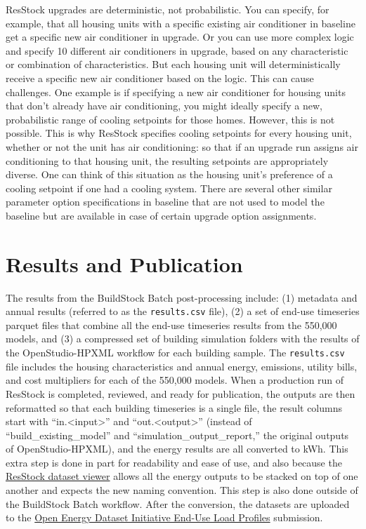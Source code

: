 ResStock upgrades are deterministic, not probabilistic. You can specify, for example, that all housing units with a specific existing air conditioner in baseline get a specific new air conditioner in upgrade. Or you can use more complex logic and specify 10 different air conditioners in upgrade, based on any characteristic or combination of characteristics. But each housing unit will deterministically receive a specific new air conditioner based on the logic. This can cause challenges. One example is if specifying a new air conditioner for housing units that don't already have air conditioning, you might ideally specify a new, probabilistic range of cooling setpoints for those homes. However, this is not possible. This is why ResStock specifies cooling setpoints for every housing unit, whether or not the unit has air conditioning: so that if an upgrade run assigns air conditioning to that housing unit, the resulting setpoints are appropriately diverse. One can think of this situation as the housing unit's preference of a cooling setpoint if one had a cooling system. There are several other similar parameter option specifications in baseline that are not used to model the baseline but are available in case of certain upgrade option assignments.



\section{Results and Publication}
The results from the BuildStock Batch post-processing include: (1) metadata and annual results (referred to as the \texttt{results.csv} file), (2) a set of end-use timeseries parquet files that combine all the end-use timeseries results from the 550,000 models, and (3) a compressed set of building simulation folders with the results of the OpenStudio-HPXML workflow for each building sample. The \texttt{results.csv} file includes the housing characteristics and annual energy, emissions, utility bills, and cost multipliers for each of the 550,000 models. When a production run of ResStock is completed, reviewed, and ready for publication, the outputs are then reformatted so that each building timeseries is a single file, the result columns start with ``in.<input>'' and ``out.<output>'' (instead of ``build\_existing\_model'' and ``simulation\_output\_report,'' the original outputs of OpenStudio-HPXML), and the energy results are all converted to kWh. This extra step is done in part for readability and ease of use, and also because the \href{https://resstock.nrel.gov/datasets}{ResStock dataset viewer} allows all the energy outputs to be stacked on top of one another and expects the new naming convention. This step is also done outside of the BuildStock Batch workflow. After the conversion, the datasets are uploaded to the \href{https://data.openei.org/submissions/4520}{Open Energy Dataset Initiative End-Use Load Profiles} submission.

